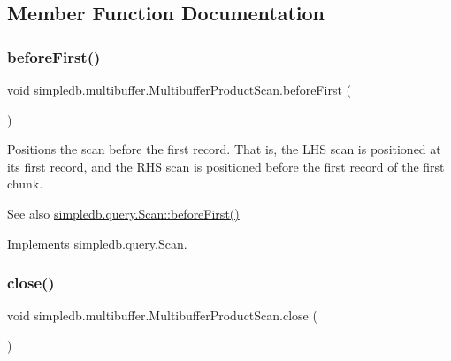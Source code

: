 \subsection{Member Function Documentation}
\mbox{\label{classsimpledb_1_1multibuffer_1_1MultibufferProductScan_ab8cc812f19837c2f6b559d2f6734d858}} 
\subsubsection{\texorpdfstring{before\+First()}{beforeFirst()}}
{\footnotesize\ttfamily void simpledb.\+multibuffer.\+Multibuffer\+Product\+Scan.\+before\+First (\begin{DoxyParamCaption}{ }\end{DoxyParamCaption})\hspace{0.3cm}{\ttfamily [inline]}}

Positions the scan before the first record. That is, the L\+HS scan is positioned at its first record, and the R\+HS scan is positioned before the first record of the first chunk. \begin{DoxySeeAlso}{See also}
\hyperlink{interfacesimpledb_1_1query_1_1Scan_a2eceb634b69da9bf1269a4355808cc6b}{simpledb.\+query.\+Scan\+::before\+First()} 
\end{DoxySeeAlso}


Implements \hyperlink{interfacesimpledb_1_1query_1_1Scan_a2eceb634b69da9bf1269a4355808cc6b}{simpledb.\+query.\+Scan}.

\mbox{\label{classsimpledb_1_1multibuffer_1_1MultibufferProductScan_a20a1d9952bcac4f243d591b56cefaad2}} 
\subsubsection{\texorpdfstring{close()}{close()}}
{\footnotesize\ttfamily void simpledb.\+multibuffer.\+Multibuffer\+Product\+Scan.\+close (\begin{DoxyParamCaption}{ }\end{DoxyParamCaption})\hspace{0.3cm}{\ttfamily [inline]}}

